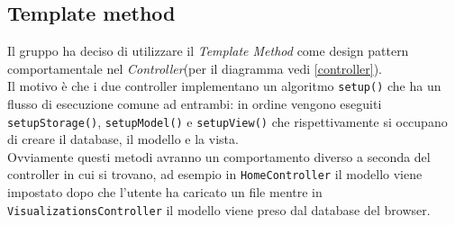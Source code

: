 \subsection{Template method}
Il gruppo ha deciso di utilizzare il \textit{Template Method} come design pattern comportamentale nel \textit{Controller}(per il diagramma vedi \ref{controller}). \\Il motivo è che i due controller implementano un algoritmo \texttt{setup()} che ha un flusso di esecuzione comune ad entrambi: in ordine vengono eseguiti \texttt{setupStorage()}, \texttt{setupModel()} e \texttt{setupView()} che rispettivamente si occupano di creare il database, il modello e la vista. \\Ovviamente questi metodi avranno un comportamento diverso a seconda del controller in cui si trovano, ad esempio in \texttt{HomeController} il modello viene impostato dopo che l'utente ha caricato un file mentre in \texttt{VisualizationsController} il modello viene preso dal database del browser.
